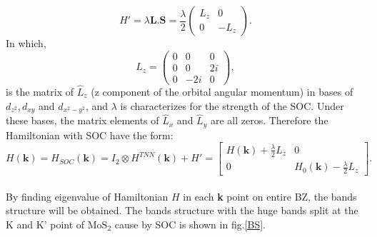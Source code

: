 \documentclass[12pt,english,a4paper]{article}
\begin{document}
	\begin{equation}
		H' = \lambda \textbf{L}.\textbf{S}=\frac{\lambda}{2}\begin{pmatrix}
			L_z &0\\
			0 & -L_z
		\end{pmatrix}.
	\end{equation}
	In which,
	\begin{equation}
		L_z = \begin{pmatrix}
			0 & 0 & 0\\
			0 & 0 & 2i\\
			0 & -2i& 0
		\end{pmatrix},
	\end{equation}
	is the matrix of $\hat{L}_z$ (z component of the orbital angular momentum) in bases of $d_{z^2}, d_{xy}$ and $d_{x^2-y^2}$, and $\lambda$ is characterizes for the strength of the SOC. Under these bases, the matrix elements of $\hat{L}_x$ and $\hat{L}_y$ are all zeros. Therefore the Hamiltonian with SOC have the form:
	\begin{equation}
		H(\textbf{k}) = H_{SOC} (\textbf{k}) = I_2 \otimes H^{TNN} (\textbf{k}) +H' = \begin{bmatrix}
			H (\textbf{k}) + \frac{\lambda}{2} L_z & 0\\
			0& H_0 (\textbf{k}) - \frac{\lambda}{2} L_z
		\end{bmatrix}.
	\end{equation}
	\\By finding eigenvalue of Hamiltonian $H$ in each \textbf{k} point on entire BZ, the bands structure will be obtained. The bands structure with the huge bands split at the K and K' point of $\mathrm{MoS}_2$ cause by SOC is shown in fig.\ref{BS}.
\end{document}
